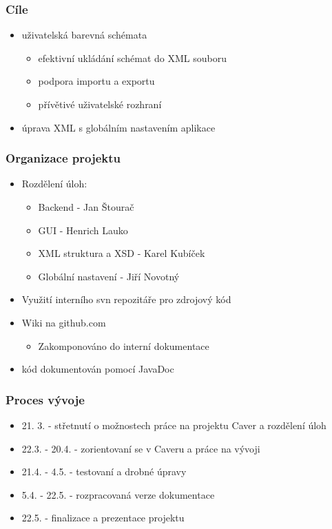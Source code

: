 \documentclass[slovak]{beamer}
\begin{document}
\begin{frame}
\frametitle{Cíle}
	\begin{itemize}
		\item uživatelská barevná schémata
		\begin{itemize}
			\item efektivní ukládání schémat do XML souboru
			\item podpora importu a exportu
			\item přívětivé uživatelské rozhraní
		\end{itemize}
		\item úprava XML s globálním nastavením aplikace
	\end{itemize}
\end{frame}

\begin{frame}
\frametitle{Organizace projektu}
	\begin{itemize}
		\item Rozdělení úloh:
		\begin{itemize}
			\item Backend - Jan Štourač
			\item GUI - Henrich Lauko
			\item XML struktura a XSD - Karel Kubíček
			\item Globální nastavení - Jiří Novotný
		\end{itemize}
		\item Využití interního svn repozitáře pro zdrojový kód
		\item Wiki na github.com
		\begin{itemize}
			\item Zakomponováno do interní dokumentace
		\end{itemize}
		\item kód dokumentován pomocí JavaDoc
	\end{itemize}
\end{frame}

\begin{frame}
\frametitle{Proces vývoje}
	\begin{itemize}
		\item 21. 3. - střetnutí o možnostech práce na projektu Caver a rozdělení úloh
		\item 22.3. - 20.4. - zorientovaní se v Caveru a práce na vývoji
		\item 21.4. - 4.5. - testovaní a drobné úpravy
		\item 5.4. - 22.5. - rozpracovaná verze dokumentace
		\item 22.5. - finalizace a prezentace projektu
	\end{itemize}
\end{frame}
\end{document}
